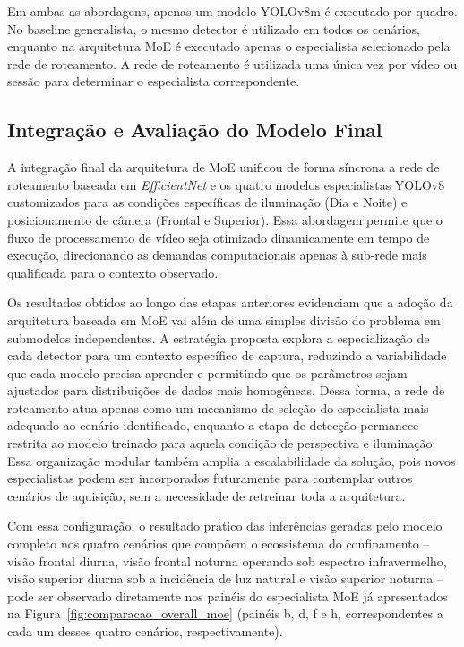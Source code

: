 \documentclass[12pt,fleqn]{article}
\begin{document}
Em ambas as abordagens, apenas um modelo YOLOv8m é executado por quadro. No baseline generalista, o mesmo detector é utilizado em todos os cenários, enquanto na arquitetura MoE é executado apenas o especialista selecionado pela rede de roteamento. A rede de roteamento é utilizada uma única vez por vídeo ou sessão para determinar o especialista correspondente.

\subsection{Integração e Avaliação do Modelo Final}

A integração final da arquitetura de MoE unificou de forma síncrona a rede de roteamento baseada em \textit{EfficientNet} e os quatro modelos especialistas YOLOv8 customizados para as condições específicas de iluminação (Dia e Noite) e posicionamento de câmera (Frontal e Superior). Essa abordagem permite que o fluxo de processamento de vídeo seja otimizado dinamicamente em tempo de execução, direcionando as demandas computacionais apenas à sub-rede mais qualificada para o contexto observado.

Os resultados obtidos ao longo das etapas anteriores evidenciam que a adoção da arquitetura baseada em MoE vai além de uma simples divisão do problema em submodelos independentes. A estratégia proposta explora a especialização de cada detector para um contexto específico de captura, reduzindo a variabilidade que cada modelo precisa aprender e permitindo que os parâmetros sejam ajustados para distribuições de dados mais homogêneas. Dessa forma, a rede de roteamento atua apenas como um mecanismo de seleção do especialista mais adequado ao cenário identificado, enquanto a etapa de detecção permanece restrita ao modelo treinado para aquela condição de perspectiva e iluminação. Essa organização modular também amplia a escalabilidade da solução, pois novos especialistas podem ser incorporados futuramente para contemplar outros cenários de aquisição, sem a necessidade de retreinar toda a arquitetura.

Com essa configuração, o resultado prático das inferências geradas pelo modelo completo nos quatro cenários que compõem o ecossistema do confinamento -- visão frontal diurna, visão frontal noturna operando sob espectro infravermelho, visão superior diurna sob a incidência de luz natural e visão superior noturna -- pode ser observado diretamente nos painéis do especialista MoE já apresentados na Figura~\ref{fig:comparacao_overall_moe} (painéis b, d, f e h, correspondentes a cada um desses quatro cenários, respectivamente).
\end{document}
